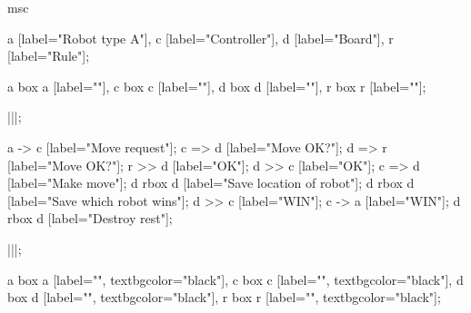 \begin{msc}
msc
{

a [label="Robot type A"],
c [label="Controller"],
d [label="Board"],
r [label="Rule"];

a box a [label=""],
c box c [label=""],
d box d [label=""],
r box r [label=""];

|||;

a -> c [label="Move request"];
c => d [label="Move OK?"];
d => r [label="Move OK?"];
r >> d [label="OK"];
d >> c [label="OK"];
c => d [label="Make move"];
d rbox d [label="Save location of robot"];
d rbox d [label="Save which robot wins"];
d >> c [label="WIN"];
c -> a [label="WIN"];
d rbox d [label="Destroy rest"];

|||;

a box a [label="", textbgcolor="black"],
c box c [label="", textbgcolor="black"],
d box d [label="", textbgcolor="black"],
r box r [label="", textbgcolor="black"];

}
\end{msc}
